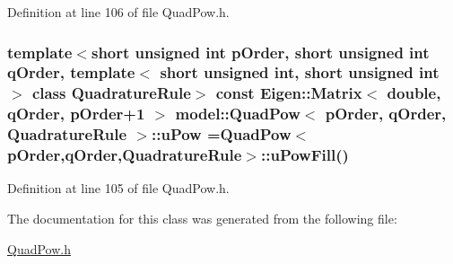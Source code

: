 Definition at line 106 of file Quad\+Pow.\+h.

\hypertarget{classmodel_1_1_quad_pow_a69933d30ada092da62f152abf4af1f67}{}
\subsubsection[{u\+Pow}]{\setlength{\rightskip}{0pt plus 5cm}template$<$short unsigned int p\+Order, short unsigned int q\+Order, template$<$ short unsigned int, short unsigned int $>$ class Quadrature\+Rule$>$ const Eigen\+::\+Matrix$<$ double, q\+Order, {\bf p\+Order}+1 $>$ {\bf model\+::\+Quad\+Pow}$<$ {\bf p\+Order}, q\+Order, Quadrature\+Rule $>$\+::u\+Pow ={\bf Quad\+Pow}$<${\bf p\+Order},q\+Order,Quadrature\+Rule$>$\+::u\+Pow\+Fill()\hspace{0.3cm}{\ttfamily [static]}}\label{classmodel_1_1_quad_pow_a69933d30ada092da62f152abf4af1f67}


Definition at line 105 of file Quad\+Pow.\+h.



The documentation for this class was generated from the following file\+:\begin{DoxyCompactItemize}
\item 
\hyperlink{_quad_pow_8h}{Quad\+Pow.\+h}\end{DoxyCompactItemize}
